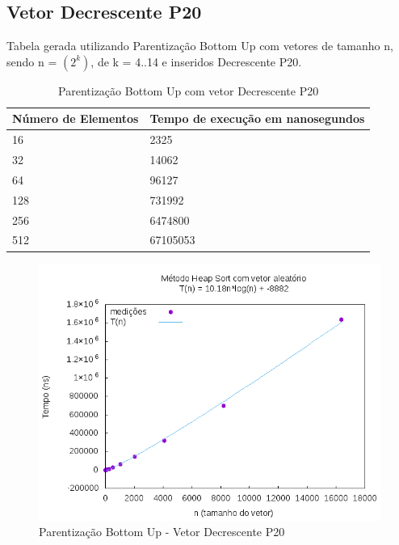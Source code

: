 \documentclass[12pt,a4paper,twoside]{report}
\begin{document}
\subsection{Vetor Decrescente P20}
Tabela gerada utilizando Parentização Bottom Up com vetores de tamanho n, sendo n = $(2^k)$, de k = 4..14 e inseridos Decrescente P20.
\begin{table}[H]
\centering
\caption{Parentização Bottom Up com vetor Decrescente P20}
\label{my-label}
\begin{tabular}{|l|l|}
\hline
\multicolumn{1}{|c|}{\textbf{Número de Elementos}} & \multicolumn{1}{c|}{\textbf{Tempo de execução em nanosegundos}} \\ \hline
16 & 2325 \\ \hline
32 & 14062 \\ \hline
64 & 96127 \\ \hline
128 & 731992 \\ \hline
256 & 6474800 \\ \hline
512 & 67105053 \\ \hline
\end{tabular}
\end{table}

\begin{figure}[H]
    \centering
    \includegraphics[width=0.7\linewidth]{graficos/HeapSort/vIntAleatorio/vIntAleatorio.png}
  \caption{Parentização Bottom Up - Vetor Decrescente P20}
\end{figure}
\end{document}
